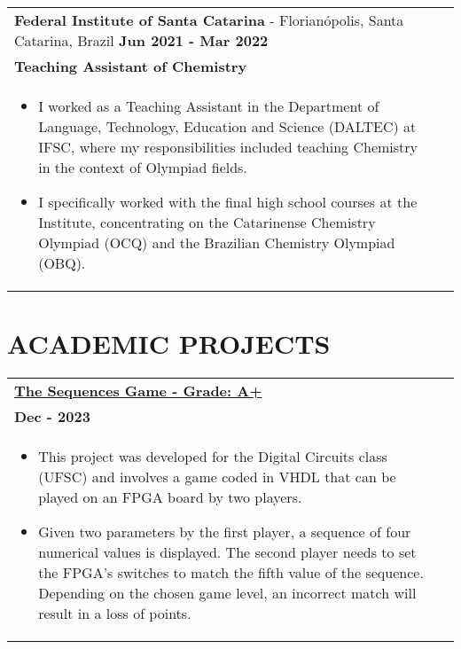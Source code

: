 \documentclass[a4paper,8pt]{article}
\begin{document}
\begin{tabularx}{\linewidth}{ @{}l r@{} }
\textbf{Federal Institute of Santa Catarina} - Florianópolis, Santa Catarina, Brazil \hfill \textbf{Jun 2021 - Mar 2022} \\[4pt]
\textbf{Teaching Assistant of Chemistry} \\[4pt]
\begin{minipage}[t]{\linewidth}
    \begin{itemize}[nosep,after=\strut, leftmargin=1em, itemsep=2pt]
        \item I worked as a Teaching Assistant in the Department of Language, Technology, Education and Science (DALTEC) at IFSC, where my responsibilities included teaching Chemistry in the context of Olympiad fields.
        \item I specifically worked with the final high school courses at the Institute, concentrating on the Catarinense Chemistry Olympiad (OCQ) and the Brazilian Chemistry Olympiad (OBQ).
    \end{itemize}
\end{minipage}
\end{tabularx}

\section{\textbf{ACADEMIC PROJECTS}}
\begin{tabularx}{\linewidth}{ @{}l r@{} }
\textbf{\href{https://github.com/leonardosm14/Playlist-Generator}{The Sequences Game - Grade: A+}} \\[4pt]
\textbf{Dec - 2023} \\[4pt]
\begin{minipage}[t]{\linewidth}
    \begin{itemize}[nosep,after=\strut, leftmargin=1em, itemsep=2pt]
        \item This project was developed for the Digital Circuits class (UFSC) and involves a game coded in VHDL that can be played on an FPGA board by two players.
        \item Given two parameters by the first player, a sequence of four numerical values is displayed. The second player needs to set the FPGA's switches to match the fifth value of the sequence. Depending on the chosen game level, an incorrect match will result in a loss of points.
    \end{itemize}
\end{minipage}
\end{tabularx}
\end{document}
